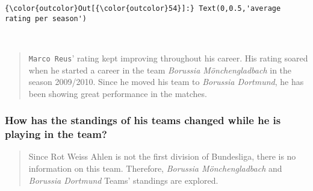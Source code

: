 \documentclass[11pt]{article}
\begin{document}
\begin{Verbatim}[commandchars=\\\{\}]
{\color{outcolor}Out[{\color{outcolor}54}]:} Text(0,0.5,'average rating per season')
\end{Verbatim}
            
    \begin{center}
    \end{center}
    { \hspace*{\fill} \\}
    
    \begin{quote}
\texttt{Marco\ Reus}' rating kept improving throughout his career. His
rating soared when he started a career in the team \emph{Borussia
Mönchengladbach} in the season 2009/2010. Since he moved his team to
\emph{Borussia Dortmund}, he has been showing great performance in the
matches.
\end{quote}

    \subsubsection{How has the standings of his teams changed while he is
playing in the
team?}\label{how-has-the-standings-of-his-teams-changed-while-he-is-playing-in-the-team}

    \begin{quote}
Since Rot Weiss Ahlen is not the first division of Bundesliga, there is
no information on this team. Therefore, \emph{Borussia Mönchengladbach}
and \emph{Borussia Dortmund} Teams' standings are explored.
\end{quote}
\end{document}
